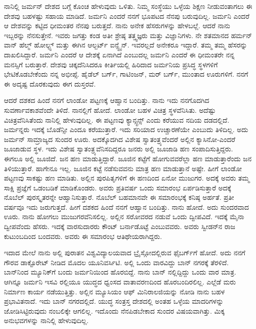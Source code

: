 
ನಾನಿಲ್ಲಿ ಜರ್ಮನ್ ದೇಶದ ಬಗ್ಗೆ ಕೊಂಚ ಹೇಳುವುದು ಒಳಿತು. ನಿಮ್ಮ ಸಂಸ್ಥೆಯು ಒಳ್ಳೆಯ ಶಿಕ್ಷಣ ನೀಡುವಂತಾಗಲು ಈ ದೇಶವು ಬಹಳಷ್ಟು ಸಹಾಯ ಮಾಡಿದೆ. ಜರ್ಮನಿ ಎಂದರೆ ನನಗೆ ಭೂಪಟದ ನೆನಪು ಬರುವುದಿಲ್ಲ. ಜರ್ಮನಿ ಎಂದರೆ ಆ ದೇಶವನ್ನು ಕಟ್ಟಿದ ಧೀಮಂತರ ನೆನಪು ಬರುತ್ತದೆ. ನಾನು ಅನೇಕ ಹೆಸರುಗಳನ್ನು ಹೇಳಬಲ್ಲೆ. ಆದರೆ ನಾನು ಇಬ್ಬರನ್ನು ನೆನಸುತ್ತೇನೆ. ಇವರು ಜಗತ್ತು ಕಂಡ ಅತೀ ಶ್ರೇಷ್ಠ ತತ್ತ್ವಜ್ಞರು ಮತ್ತು ವಿಜ್ಞಾನಿಗಳು.  ನೇ ಶತಮಾನದ ಹರ್ಮನ್ ವಾನ್ ಹೆಲ್ಮ್ ‍ಹೋಲ್ಟ್ಸ್ ಮತ್ತು ಈಗಿನ ಆಲ್ಬರ್ಟ್ ಐನ್ಸ್ಟೈನ್. ಇವರಲ್ಲದೆ ಅನೇಕರೂ ಇದ್ದಾರೆ. ತಮ್ಮ ತಮ್ಮ ಹೆಸರನ್ನು ದಾಖಲಿಸಿದ್ದಾರೆ. ಜರ್ಮನಿ ಎಂದರೆ ಆ ದೇಶಕ್ಕೆ ಏನಾಗಿದೆ ಎಂಬುದಲ್ಲ ಜರ್ಮನಿ ಎಂದರೆ ಈ ಧೀಮಂತರೇ ನನ್ನ ಮನಸ್ಸಿಗೆ ಬರುತ್ತಾರೆ. ದೇಶವು ಚಿಕ್ಕದೆನಿಸಿದರೂ ಕೀರ್ತಿಯಲ್ಲಿ ಹಿರಿದಾದ ಜರ್ಮನಿಯ ಪ್ರಸಿದ್ಧ ಸ್ಥಳಗಳಿಗೆ ಭೇಟಿಕೊಡಬೇಕೆಂದು ನನ್ನ ಅಭೀಪ್ಸೆ. ಹೈಡೆಲ್ ಬರ್ಗ್, ಗಾಟಿಂಜನ್, ಮರ್ ಬರ್ಗ್, ಮುಂತಾದ ಊರುಗಳಿಗೆ. ನನಗೆ ಈ ಅದೃಷ್ಟ ದೊರಕುವುದು ಈಗ ದುಸ್ತರವೆ.

ಆದರೆ ದಶಕದ ಹಿಂದೆ ನನಗೆ ಲಾಂಡೋ ಪಟ್ಟಣಕ್ಕೆ ಆಹ್ವಾನ ಬಂದಿತ್ತು. ನಾನು ಇದು ನನಗೊದಗಿದ ಸುವರ್ಣಾವಕಾಶವೆಂದೇ ತಿಳಿದೆ. ನಾನಲ್ಲಿಗೆ ಹೋದೆ. ಲಾಂಡೋ ಬಹಳ ವಿಚಿತ್ರ ಸ್ಥಳವೆನಿಸಿತು. ಅದೆಷ್ಟು ವಿಚಿತ್ರವೆನಿಸಿತೆಂದು ನಾನಿಲ್ಲಿ ಹೇಳುವುದಿಲ್ಲ. ಈ ಪಟ್ಟಣವು ಕ್ಯಾನ್ಸ್ಟನ್ಸ್ ಎಂದು ಕರೆಯುವ ನದಿಯ ದಡದಲ್ಲಿದೆ. ಜರ್ಮನ್ನರು ಇದಕ್ಕೆ ಬೊಡೆನ್ಸೀ ಎಂದೂ ಕರೆಯುತ್ತಾರೆ. ಇದು ಸರಿಯಾದ ಉಚ್ಚಾರಣೆಯೇ ಎಂಬುದು ತಿಳಿದಿಲ್ಲ. ಅದು ಜರ್ಮನ್ ಸಾಮ್ರಾಜ್ಯದ ಸುಂದರ ಊರು. ಅದಕ್ಕೊದಗಿದ ವಿಶೇಷ ಸ್ವಾತಂತ್ರ್ಯವೆಂದರೆ ಅಲ್ಲಿನ ಕ್ಯಾಸಿನೋ-ಎಂದರೆ ಜೂಜಾಡುವ ಸ್ಥಳ. ಇದು ವಿಶೇಷ ಸ್ವಾತಂತ್ರ್ಯವೆನಿಸದಿದ್ದರೂ ಜನರು ಅಲ್ಲಿ ಜೂಜಾಡಿ ಹಣ ಸಂಪಾದಿಸುತ್ತಿದ್ದರು. ಈಗಲೂ ಅಲ್ಲಿ ಜೂಜಿದೆ. ಜನ ಹಣ ಮಾಡುತ್ತಿದ್ದಾರೆ. ಜೂಜಿನ ಕಟ್ಟೆಗೆ ಹೋಗುವವರೆಲ್ಲಾ ಹಣ ಮಾಡುತ್ತಾರೆಂದು ಜನ ತಿಳಿಯುತ್ತಾರೆ. ಹಾಗೇನೂ ಇಲ್ಲ. ಜೂಜಿನ ಕಟ್ಟೆ ನಡೆಸುವವನು ಮಾತ್ರ ಹಣ ಮಾಡುತ್ತಾನೆ ಅಷ್ಟೇ. ಹೀಗೆ ಲಾಂಡೋ ಪಟ್ಟಣವು ಸಾಕಷ್ಟು ಹಣ ಮಾಡಿತು. ಅಲ್ಲಿನ ಪುರಪಿತೃಗಳಿಗೆ ಈ ಹಣದಿಂದ ಏನೋ ಮುಜುಗರ. ಅದಕ್ಕೆ ಅವರು ತಮ್ಮ ಸಾಕ್ಷಿ ಪ್ರಜ್ಞೆಗೆ ಒಡಂಬಡಿಕೆ ಮಾಡಿಕೊಂಡರು. ಅವರು ಪ್ರತಿವರ್ಷ ಒಂದು ಸಮಾರಂಭ ಏರ್ಪಡಿಸುತ್ತಾರೆ ಅದಕ್ಕೆ ನೊಬೆಲ್ ಪುರಸ್ಕೃತರನ್ನೇ ಆಹ್ವಾನಿಸುತ್ತಾರೆ. ನೊಬೆಲ್ ಬಹಮಾನವೇ ಈ ಸಮಾರಂಭಕ್ಕೆ ಕನಿಷ್ಠ ಅರ್ಹತೆ. ಪ್ರತೀ ವರ್ಷವೂ ಇದು ಜರುಗುತ್ತದೆ. ಹೀಗೆ ದಶಕದ ಹಿಂದೆ ನನಗೆ ಆಹ್ವಾನ ಬಂದಿತ್ತು. ನಾನು ಹೋದೆ. ಅದು ಸುಂದರವಾದ ಊರು. ನಾನು ಹೋಗಲು ಮುಜುಗರವೆನಿಸಲಿಲ್ಲ. ಅಲ್ಲಿನ ಸರೋವರದ ನಡುವೆ ಒಂದು ದ್ವೀಪವಿದೆ. ಇದಕ್ಕೆ ಮೈನಾ ದ್ವೀಪವೆಂದು ಹೆಸರು. ಇದಕ್ಕೆ ವಾರಸುದಾರರು ಕೌಂಟ್ ಬರ್ನಾಡೊಟ್ಟೆ ಎಂಬುವವರು. ಅವರು ಸ್ವೀಡನ್‍ನ ರಾಜ ಕುಟುಂಬದಿಂದ ಬಂದವರು. ಅವರು ಈ ಸಮಾರಂಭ ಆತಿಥೇಯರಾಗಿದ್ದರು.

ಇದಾದ ಮೇಲೆ ನಾನು ಅಲ್ಲಿ ಪುರಾತನ ವಿಶ್ವವಿದ್ಯಾಲಯವಾದ ಬ್ರೈಸ್ಗೋದಲ್ಲಿರುವ ಫೈಬರ್ಗ್‌ಗೆ ಹೋದೆ. ಅದು ನನಗೆ ಗೌರವ ಡಾಕ್ಟೊರೇಟ್ ನೀಡಿದ ಮೊದಲ ಯೂನಿವರ್ಸಿಟಿ. ಅಲ್ಲಿ ಒಂದು ವಾರವಿದ್ದು ಬಾನ್ ನಗರಕ್ಕೆ ತೆರಳಿದೆ. ಬಾನ್‍ನಿಂದ ಮ್ಯೂನಿಕ್‍ಗೆ ಬಂದು ಜರ್ಮನಿಯಿಂದ ಹೊರಬಿದ್ದೆ. ನಾನು ಬಾನ್ ನಲ್ಲಿದ್ದಿದ್ದು ಒಂದು ವಾರ ಮಾತ್ರ. ಆಗಿನ್ನೂ ಜರ್ಮನಿ ಇಸವಿ ರಲ್ಲಿಯೂ ಯುದ್ಧದ ಧ್ವಂಸದ ವಾತಾವರಣದಿಂದ ಹೊರಬಂದಿರಲಿಲ್ಲ. ಎಲ್ಲೆಡೆ ಮರು ನಿರ್ಮಾಣ ಕಾರ್ಯ ನಡೆಯುತ್ತಿತ್ತು. ಅಲ್ಲಿನ ಮ್ಯೂಸಿಯಂ ಆಫ್ ಮಿನಿರಾಲಜಿಯನ್ನು ನೋಡಿ ನಾನು ಬಹಳ ಪ್ರಭಾವಿತನಾದೆ. ಇದು ಬಾನ್ ನಗರದಲ್ಲಿದೆ. ಯುದ್ಧ ಸಂತ್ರಸ್ತ ದೇಶದಲ್ಲಿ ಅಂತಹ ಒಳ್ಳೆಯ ಮಾದರಿಗಳನ್ನು ಜೋಡಿಸಿಟ್ಟಿರುವುದು ನಂಬಲಿಕ್ಕೇ ಆಗಲಿಲ್ಲ. ಇದೊಂದು ನೆನಪಿಡಬೇಕಾದ ಸುಂದರ ವಿಷಯವಾಗಿತ್ತು. ಮಿಕ್ಕ ಅನುಭವಗಳನ್ನು ನಾನಿಲ್ಲಿ ಹೇಳುವುದಿಲ್ಲ.

